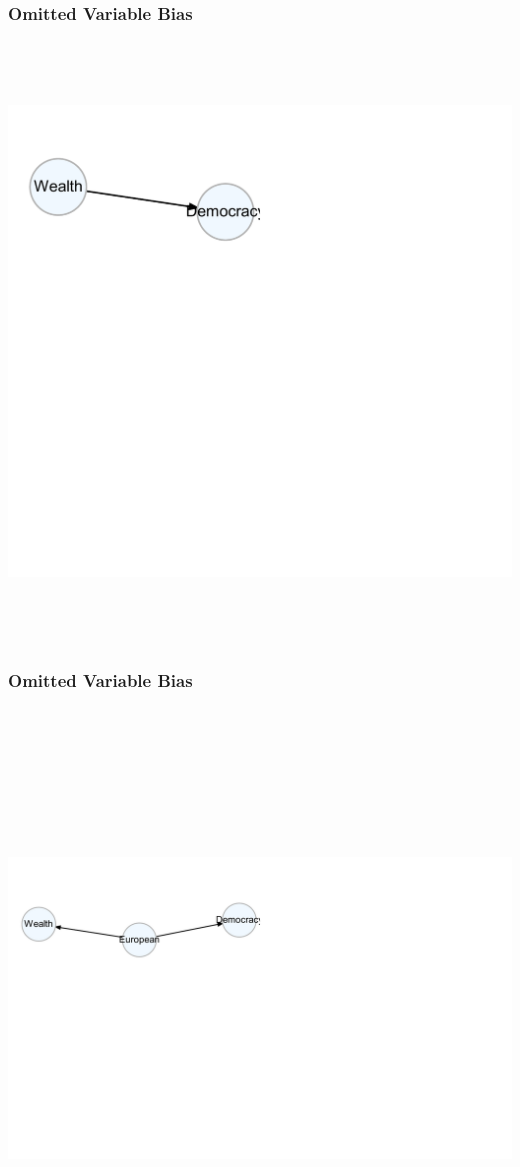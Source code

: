 \documentclass[xcolor=x11names,compress]{beamer}\usepackage[]{graphicx}\usepackage[]{color}
\newenvironment{knitrout}{}{} %
\renewcommand{\(}{\begin{columns}}
\renewcommand{\)}{\end{columns}}
\newcommand{\<}[1]{\begin{column}{#1}}
\renewcommand{\>}{\end{column}}
\begin{document}
\begin{frame}
\frametitle{Omitted Variable Bias}
\begin{knitrout}
\color{fgcolor}

{\centering \includegraphics[width=600,height=600]{figure/unnamed-chunk-1-1} 

}



\end{knitrout}
\end{frame}

\begin{frame}
\frametitle{Omitted Variable Bias}
\begin{knitrout}
\color{fgcolor}

{\centering \includegraphics[width=600,height=600]{figure/unnamed-chunk-2-1} 

}



\end{knitrout}
\end{frame}
\end{document}

